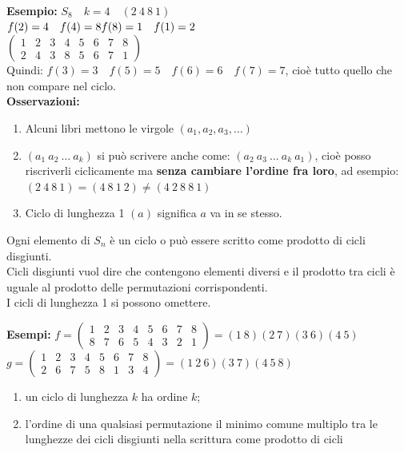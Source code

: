 \documentclass[12pt, letterpaper]{report}
\newcounter{theorem}
\begin{document}
 		\textbf{Esempio:} $S_8 \quad k = 4 \quad (2\ 4\ 8\ 1)$ \\
 		$f(2) = 4 \quad f(4) = 8 \\ f(8) = 1 \quad f(1) = 2$ \\
 		$\begin{pmatrix}
 			1 & 2 & 3 & 4 & 5 & 6 & 7 & 8 \\
 			2 & 4 & 3 & 8 & 5 & 6 & 7 & 1
 		\end{pmatrix}$ \\
 		Quindi: $f(3) = 3 \quad f(5) = 5 \quad f(6) = 6 \quad f(7) = 7$, cioè tutto quello che non compare nel ciclo. \\
 		\textbf{Osservazioni:}
 		\begin{enumerate}
 			\item Alcuni libri mettono le virgole $(a_1, a_2, a_3, \dots)$
 			\item $(a_1\ a_2\ \dots\ a_k)$ si può scrivere anche come: $(a_2\ a_3\ \dots\ a_k\ a_1)$, cioè posso riscriverli ciclicamente ma \textbf{senza cambiare l'ordine fra loro}, ad esempio: $(2\ 4\ 8\ 1)=(4\ 8\ 1\ 2)\neq(4\ 2\ 8\ 8\ 1)$
 			\item Ciclo di lunghezza 1 $(a)$ significa $a$ va in se stesso.
 		\end{enumerate}
 		 \begin{theorem}{}{}
 		 	Ogni elemento di $S_n$ è un ciclo o può essere scritto come prodotto di cicli disgiunti. \\
 		 	Cicli disgiunti vuol dire che contengono elementi diversi e il prodotto tra cicli è uguale al prodotto delle permutazioni corrispondenti. \\
 		 	I cicli di lunghezza 1 si possono omettere.
 		\end{theorem}
 		\textbf{Esempi:} $f= \begin{pmatrix}
 			1 & 2 & 3 & 4 & 5 & 6 & 7 & 8 \\
 			8 & 7 & 6 & 5 & 4 & 3 & 2 & 1
 		\end{pmatrix} = (1\ 8)(2\ 7)(3\ 6)(4\ 5)$ \\
 		$g = \begin{pmatrix}
 			1 & 2 & 3 & 4 & 5 & 6 & 7 & 8 \\
 			2 & 6 & 7 & 5 & 8 & 1 & 3 & 4
 		\end{pmatrix} = (1\ 2\ 6)(3\ 7)(4\ 5\ 8)$
 		 \begin{theorem}{}{}
 			\begin{enumerate}
 				\item un ciclo di lunghezza $k$ ha ordine $k$;
 				\item l'ordine di una qualsiasi permutazione il minimo comune multiplo tra le lunghezze dei cicli disgiunti nella scrittura come prodotto di cicli
 			\end{enumerate}
 		\end{theorem}
\end{document}
